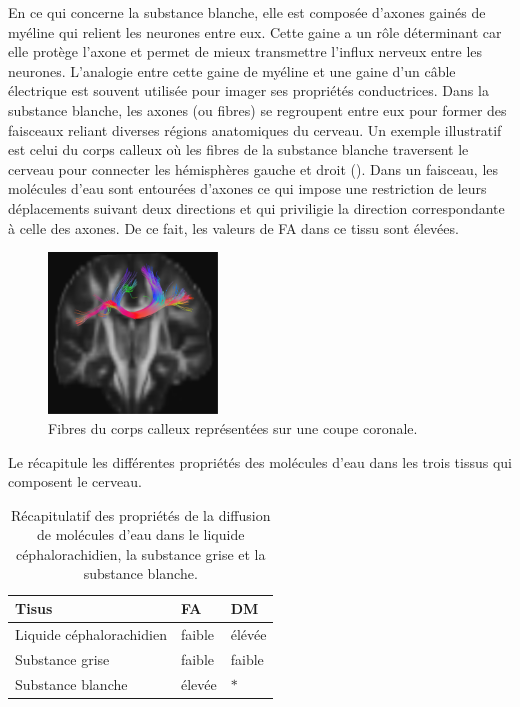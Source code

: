 En ce qui concerne la substance blanche, elle est composée d'axones gainés de myéline qui relient les neurones entre eux.
Cette gaine a un rôle déterminant car elle protège l'axone et permet de mieux transmettre l'influx nerveux entre les neurones.
L'analogie entre cette gaine de myéline et une gaine d'un câble électrique est souvent utilisée pour imager ses propriétés conductrices.
Dans la substance blanche, les axones (ou fibres) se regroupent entre eux pour former des faisceaux reliant diverses régions anatomiques du cerveau.
Un exemple illustratif est celui du corps calleux où les fibres de la substance blanche traversent le cerveau 
pour connecter les hémisphères gauche et droit ().
Dans un faisceau, les molécules d'eau sont entourées d'axones ce qui impose une restriction de leurs déplacements suivant deux directions
et qui priviligie la direction correspondante à celle des axones.
De ce fait, les valeurs de FA dans ce tissu sont élevées.

\begin{figure}[ht]
    \centering
    \includegraphics[width=0.4\textwidth]{Images/tracto_corps_calleux.pdf}
    \caption{\label{fig:tracto_corps_calleux}Fibres du corps calleux représentées sur une coupe coronale.}
\end{figure}

Le  récapitule les différentes propriétés des molécules d'eau dans les trois tissus qui composent le cerveau.
\begin{table}[ht]
    \centering
    \begin{tabular}{D{5cm}||D{3cm}|D{3cm}}
	\textbf{Tisus} & \textbf{FA} & \textbf{DM} \tabularnewline
	\hline
	Liquide céphalorachidien & faible & élévée \tabularnewline
	Substance grise & faible & faible \tabularnewline
	Substance blanche & élevée & $\ast$ \tabularnewline
	\hline
    \end{tabular}
    \caption{\label{tab:description}Récapitulatif des propriétés de la diffusion de molécules d'eau 
    dans le liquide céphalorachidien, la substance grise et la substance blanche.}
\end{table}


